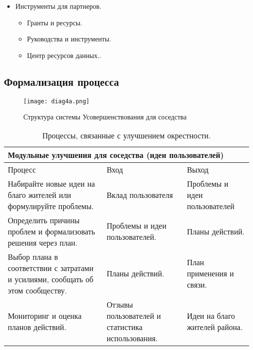 \begin{itemize}
\begin{itemize}
    \end{itemize}
     \item Инструменты для партнеров\cite{partners}.
   \begin{itemize}
         \item Гранты и ресурсы\cite{resources}.
         \item Руководства и инструменты\cite{tools}.
         \item Центр ресурсов данных.\cite{center}.   
    \end{itemize}
\end{itemize}
\newpage

\subsection{Формализация процесса}
 
\begin{figure}[h]
  \centering
  \texttt{[image: diag4a.png]}
  \caption{Структура системы Усовершенствования для соседства}
  \label{image:scheme12}
\end{figure}

\begin{table}[]
\centering
\begin{tabular}{|p{5cm}|p{5cm}|p{5cm}|}
\hline
\multicolumn{3}{|p{15cm}|}{Модульные улучшения для соседства (идеи пользователей)} \\ \hline

 Процесс  & Вход & Выход \\ \hline \hline
Набирайте новые идеи на благо жителей или формулируйте проблемы.& Вклад пользователя &
Проблемы и идеи пользователей\\ \hline
Определить причины проблем и формализовать решения через план. & Проблемы и идеи пользователей.& Планы действий. \\ \hline
Выбор плана в соответствии с затратами и усилиями, сообщать об этом сообществу. & Планы действий.& План применения и связи.\\ \hline
Мониторинг и оценка планов действий. & Отзывы пользователей и статистика использования. & Идеи на благо жителей района.\\ \hline
\end{tabular}
\centering
\caption{Процессы, связанные с улучшением окрестности.}
\centering
\label{tabla:sencilla2}
\end{table}







